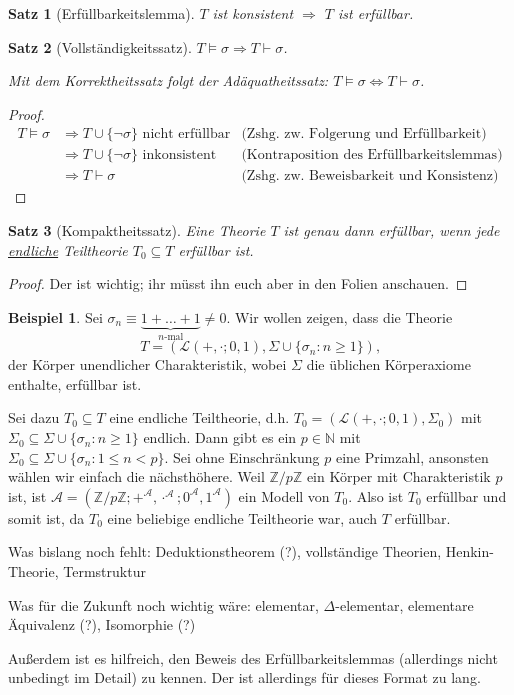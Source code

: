 \documentclass[german,headsepline,fleqn,parskip=half]{scrartcl}
\theoremstyle{definition}
\newtheorem*{ex}{Beispiel}
\theoremstyle{plain}
\newtheorem*{thm}{Satz}
\newcommand{\lng}{\mathcal{L}}
\newcommand{\modA}{\mathcal{A}}
\begin{document}
	\begin{thm}[Erfüllbarkeitslemma]
		$T$ ist konsistent $\Rightarrow$ $T$ ist erfüllbar.
	\end{thm}

	\begin{thm}[Vollständigkeitssatz]
		$T\models\sigma\Rightarrow T\vdash\sigma$.
		
		Mit dem Korrektheitssatz folgt der Adäquatheitssatz:
		$T\models\sigma\Leftrightarrow T\vdash\sigma$.
	\end{thm}
	\begin{proof}
		\begin{align*}
			T\models\sigma
			&\Rightarrow T\cup\{\lnot\sigma\}\text{ nicht erfüllbar} &\text{(Zshg. zw. Folgerung und Erfüllbarkeit)} \\
			&\Rightarrow T\cup\{\lnot\sigma\}\text{ inkonsistent} &\text{(Kontraposition des Erfüllbarkeitslemmas)} \\
			&\Rightarrow T\vdash\sigma &\text{(Zshg. zw. Beweisbarkeit und Konsistenz)}
		\end{align*}
	\end{proof}

	\begin{thm}[Kompaktheitssatz]
		Eine Theorie $T$ ist genau dann erfüllbar,
		wenn jede \underline{endliche} Teiltheorie $T_0\subseteq T$ erfüllbar ist.
	\end{thm}
	\begin{proof}
		Der ist wichtig; ihr müsst ihn euch aber in den Folien anschauen.
	\end{proof}
	
	\begin{ex}
		Sei $\sigma_n\equiv\underbrace{1+\ldots+1}_{n\text{-mal}}\neq0$.
		Wir wollen zeigen, dass die Theorie
		\[T=(\lng(+,\cdot;0,1),\Sigma\cup\{\sigma_n\colon n\geq1\})\text{,}\]
		der Körper unendlicher Charakteristik,
		wobei $\Sigma$ die üblichen Körperaxiome enthalte,
		erfüllbar ist.
		
		Sei dazu $T_0\subseteq T$ eine endliche Teiltheorie,
		d.h. $T_0=(\lng(+,\cdot;0,1),\Sigma_0)$ mit $\Sigma_0\subseteq\Sigma\cup\{\sigma_n\colon n\geq1\}$ endlich.
		Dann gibt es ein $p\in\mathbb{N}$ mit $\Sigma_0\subseteq\Sigma\cup\{\sigma_n\colon1\leq n<p\}$.
		Sei ohne Einschränkung $p$ eine Primzahl, ansonsten wählen wir einfach die nächsthöhere.
		Weil $\mathbb{Z}/p\mathbb{Z}$ ein Körper mit Charakteristik $p$ ist,
		ist  $\modA=(\mathbb{Z}/p\mathbb{Z};+^\modA,\cdot^\modA;0^\modA,1^\modA)$ ein Modell von $T_0$.
		Also ist $T_0$ erfüllbar und somit ist,
		da $T_0$ eine beliebige endliche Teiltheorie war,
		auch $T$ erfüllbar.
	\end{ex}

	Was bislang noch fehlt: Deduktionstheorem (?), vollständige Theorien, Henkin-Theorie, Termstruktur
	
	Was für die Zukunft noch wichtig wäre: elementar, $\Delta$-elementar,
	elementare Äquivalenz (?), Isomorphie (?)
	
	Außerdem ist es hilfreich, den Beweis des Erfüllbarkeitslemmas (allerdings nicht unbedingt im Detail) zu kennen.
	Der ist allerdings für dieses Format zu lang.
\end{document}
